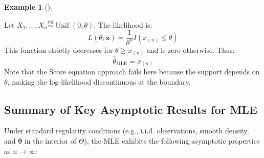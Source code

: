 \documentclass[
  letterpaper,
  DIV=11,
  numbers=noendperiod]{scrreprt}
\renewcommand{\[}{\begin{equation}}
\renewcommand{\]}{\end{equation}}
\theoremstyle{definition}
\theoremstyle{plain}
\theoremstyle{plain}
\theoremstyle{plain}
\theoremstyle{definition}
\newtheorem{example}{Example}[chapter]
\theoremstyle{plain}
\theoremstyle{remark}
\begin{document}
\begin{example}[]\protect\hypertarget{exm-uniform-mle-boundary}{}\label{exm-uniform-mle-boundary}

Let
\(X_1, \dots, X_n \overset{iid}{\sim} \operatorname{\text{Unif}}(0, \theta)\).
The likelihood is: \[
L(\theta; \mathbf{x}) = \frac{1}{\theta^n} I(x_{(n)} \le \theta)
\] This function strictly decreases for \(\theta \ge x_{(n)}\) and is
zero otherwise. Thus: \[
\hat{\theta}_{\text{MLE}} = x_{(n)}
\] Note that the Score equation approach fails here because the support
depends on \(\theta\), making the log-likelihood discontinuous at the
boundary.

\end{example}

\subsection{Summary of Key Asymptotic Results for
MLE}\label{summary-of-key-asymptotic-results-for-mle}

Under standard regularity conditions (e.g., i.i.d. observations, smooth
density, and \(\boldsymbol{\theta}\) in the interior of \(\Theta\)), the
MLE exhibits the following asymptotic properties as \(n \to \infty\):
\end{document}
